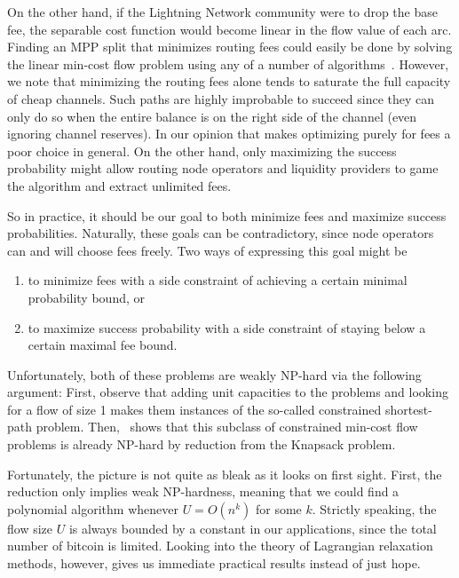 \documentclass[10pt,twocolumn]{article}
\begin{document}
On the other hand, if the Lightning Network community were to drop the base fee, the separable cost function would become linear in the flow value of each arc.
Finding an MPP split that minimizes routing fees could easily be done by solving the linear min-cost flow problem using any of a number of algorithms~\cite{ahuja1993network}.
However, we note that minimizing the routing fees alone tends to
saturate the full capacity of cheap channels. Such paths are highly improbable to succeed since they can only do so when the entire balance is on the right side of the channel (even ignoring channel reserves). In our opinion that makes optimizing purely for fees a poor choice in general. On the other hand, only maximizing the success probability might allow routing node operators and liquidity providers to game the algorithm and extract unlimited fees.

So in practice, it should be our goal to both minimize fees and maximize success probabilities.
Naturally, these goals can be contradictory, since node operators
can and will choose fees freely. Two ways of expressing this goal might be
\begin{enumerate}
\item to minimize fees with a side constraint of achieving a certain minimal probability bound, or
\item to maximize success probability with a side constraint of staying below a certain maximal fee bound.
\end{enumerate}

Unfortunately, both of these problems are weakly NP-hard via the following argument:
First, observe that adding unit capacities to the problems and looking for a flow of size 1 makes them instances of the so-called constrained shortest-path problem.
Then,~\cite[p.~798]{ahuja1993network} shows that this subclass of constrained min-cost flow problems is already NP-hard by reduction from the Knapsack problem.

Fortunately, the picture is not quite as bleak as it looks on first sight.
First, the reduction only implies weak NP-hardness, meaning that we could find a polynomial algorithm whenever $U=O(n^k)$ for some $k$.
Strictly speaking, the flow size $U$ is always bounded by a constant in our applications, since the total number of bitcoin is limited. Looking into the theory of Lagrangian relaxation~\cite[p.~598ff]{ahuja1993network} methods, however, gives us immediate practical results instead of just hope.
\end{document}
